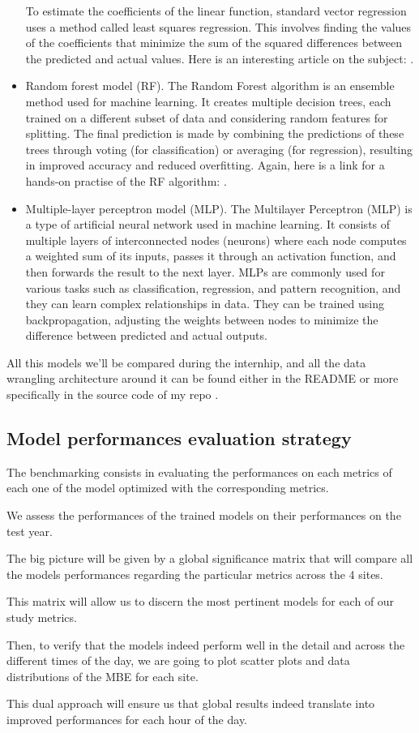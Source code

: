 \begin{itemize}
To estimate the coefficients of the linear function, standard vector regression uses a method called least squares regression. This involves finding the values of the coefficients that minimize the sum of the squared differences between the predicted and actual values.
    Here is an interesting article on the subject: \cite{SVR}.
    \item Random forest model (RF).
    The Random Forest algorithm is an ensemble method used for machine learning. It creates multiple decision trees, each trained on a different subset of data and considering random features for splitting. The final prediction is made by combining the predictions of these trees through voting (for classification) or averaging (for regression), resulting in improved accuracy and reduced overfitting.
Again, here is a link for a hands-on practise of the RF algorithm: \cite{RF}.
    \item Multiple-layer perceptron model (MLP).
The Multilayer Perceptron (MLP) is a type of artificial neural network used in machine learning. It consists of multiple layers of interconnected nodes (neurons) where each node computes a weighted sum of its inputs, passes it through an activation function, and then forwards the result to the next layer. MLPs are commonly used for various tasks such as classification, regression, and pattern recognition, and they can learn complex relationships in data. They can be trained using backpropagation, adjusting the weights between nodes to minimize the difference between predicted and actual outputs.

\end{itemize}
All this models we'll be compared during the internhip, and all the data wrangling architecture around it can be found either in the README or more specifically in the source code of my repo \cite{myrepo}.
\subsection{Model performances evaluation strategy}
The benchmarking consists in evaluating the performances on each metrics of each one of the model optimized with the corresponding metrics.

We assess the performances of the trained models on their performances on the test year.

The big picture will be given by a global significance matrix that will compare all the models performances regarding the particular metrics across the 4 sites.

This matrix will allow us to discern the most pertinent models for each of our study metrics.

Then, to verify that the models indeed perform well in the detail and across the different times of the day, we are going to plot scatter plots and data distributions of the MBE for each site.

This dual approach will ensure us that global results indeed translate into improved performances for each hour of the day.